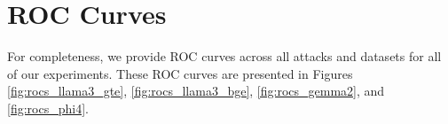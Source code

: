 
\section{ROC Curves}
\label{app:roc_curves}

For completeness, we provide ROC curves across all attacks and datasets for all of our experiments. These ROC curves are presented in Figures \ref{fig:rocs_llama3_gte}, \ref{fig:rocs_llama3_bge}, \ref{fig:rocs_gemma2}, and \ref{fig:rocs_phi4}.


